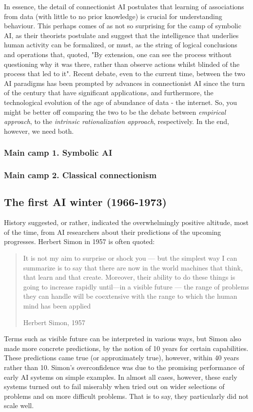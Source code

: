 In essence, the detail of connectionist AI postulates that learning of associations from data (with little to no prior knowledge) is crucial for understanding behaviour. This perhaps comes of as not so surprising for the camp of symbolic AI, as their theorists postulate and suggest that the intelligence that underlies human activity can be formalized, or must, as the string of logical conclusions and operations that, quoted, "By extension, one can see the process without questioning why it was there, rather than observe actions whilst blinded of the process that led to it". Recent debate, even to the current time, between the two AI paradigms has been prompted by advances in connectionist AI since the turn of the century that have significant applications, and furthermore, the technological evolution of the age of abundance of data - the internet. So, you might be better off comparing the two to be the debate between \textit{empirical approach}, to the \textit{intrinsic rationalization approach}, respectively. In the end, however, we need both. \cite{Goel_2022}

\subsubsection{Main camp 1. Symbolic AI}

\subsubsection{Main camp 2. Classical connectionism}

\subsection{The first AI winter (1966-1973)}

History suggested, or rather, indicated the overwhelmingly positive altitude, most of the time, from AI researchers about their predictions of the upcoming progresses. Herbert Simon in 1957 is often quoted: 
\blockquote[Herbert Simon, 1957]{It is not my aim to surprise or shock you --- but the simplest way I can summarize is to say that there are now in the world machines that think, that learn and that create. Moreover, their ability to do these things is going to increase rapidly until—in a visible future --- the range of problems they can handle will be coextensive with the range to which the human mind has been applied}

Terms such as visible future can be interpreted in various ways, but Simon also made more concrete predictions, by the notion of 10 years for certain capabilities. These predictions came true (or approximately true), however, within 40 years rather than 10. Simon's overconfidence was due to the promising performance of early AI systems on simple examples. In almost all cases, however, these early systems turned out to fail miserably when tried out on wider selections of problems and on more difficult problems. That is to say, they particularly did not scale well. 


